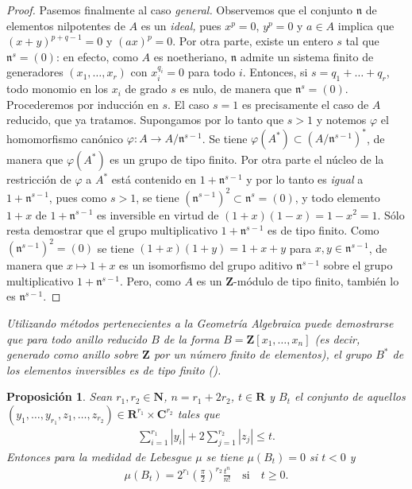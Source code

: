 \documentclass[10pt,oneside,bibtotoc,smallheadings,leqno,a5paper,DIV=12]{scrbook}
\newcommand{\RR}{\mathbf{R}}
\newcommand{\ZZ}{\mathbf{Z}}
\newcommand{\NN}{\mathbf{N}}
\newcommand{\CC}{\mathbf{C}}
\newcommand{\idl}[1]{\mathfrak{#1}}
\newcommand{\QED}{}%
\newcommand{\abs}[1]{\left\lvert#1\right\rvert}
\renewcommand{\to}[1][]{\xrightarrow{#1}}
\numberwithin{equation}{section}
\newenvironment{comm}%
	{\begin{trivlist}\item\small\itshape}
	{\end{trivlist}}
\theoremstyle{defi}
\theoremstyle{enonce}
\newtheorem*{proposition*}{Proposici\'on}
\theoremstyle{rem}
\numberwithin{theorem}{section}
\numberwithin{proposition}{section}
\numberwithin{definition}{section}
\numberwithin{lemma}{section}
\numberwithin{corollary}{section}
\numberwithin{example}{section}
\numberwithin{footnote}{section}%
\begin{document}
\begin{proof}
Pasemos finalmente al caso {\em general.} Observemos que el conjunto $\idl{n}$ de elementos nilpotentes de $A$
es un {\em ideal,} pues $x^{p}=0$, $y^{p}=0$ y $a\in A$ implica que $(x+y)^{p+q-1}=0$ y $(ax)^{p}=0$. Por otra parte,
existe un entero $s$ tal que $\idl{n}^{s}=(0)$: en efecto, como $A$ es noetheriano, $\idl{n}$ admite un sistema
finito de generadores $(x_{1},\dots,x_{r})$ con $x_{i}^{q_{i}}=0$ para todo $i$. Entonces, si $s = q_{1}+\dots+q_{r}$,
todo monomio en los $x_{i}$ de grado $s$ es nulo, de manera que $\idl{n}^{s}=(0)$. Procederemos por inducci\'on
en $s$. El caso $s=1$ es precisamente el caso de $A$ reducido, que ya tratamos. Supongamos por lo tanto que
$s>1$ y notemos $\varphi$ el homomorfismo can\'onico $\varphi:A\to A/\idl{n}^{s-1}$. Se tiene
$\varphi(A^{*})\subset(A/\idl{n}^{s-1})^{*}$, de manera que $\varphi(A^{*})$ es un grupo de tipo finito. Por
otra parte el n\'ucleo de la restricci\'on de $\varphi$ a $A^{*}$ est\'a contenido en $1+\idl{n}^{s-1}$ y
por lo tanto es {\em igual} a $1+\idl{n}^{s-1}$, pues como $s>1$, se tiene $(\idl{n}^{s-1})^{2}\subset\idl{n}^{s}=(0)$,
y todo elemento $1+x$ de $1+\idl{n}^{s-1}$ es inversible en virtud de
$(1+x)(1-x) = 1-x^{2}=1$. S\'olo resta demostrar que el grupo multiplicativo $1+\idl{n}^{s-1}$ es de tipo finito.
Como $(\idl{n}^{s-1})^{2}=(0)$ se tiene $(1+x)(1+y) = 1+x+y$ para $x,y\in\idl{n}^{s-1}$, de manera que
$x\mapsto 1+x$ es un isomorfismo del grupo aditivo $\idl{n}^{s-1}$ sobre el grupo multiplicativo $1+\idl{n}^{s-1}$.
Pero, como $A$ es un $\ZZ$-m\'odulo de tipo finito, tambi\'en lo es $\idl{n}^{s-1}$. \QED
\end{proof}

\begin{comm}
Utilizando m\'etodos pertenecientes a la Geometr\'ia Algebraica puede demostrarse que para todo anillo
{\em reducido} $B$ de la forma $B = \ZZ[x_{1},\dots,x_{n}]$ (es decir, generado como anillo sobre $\ZZ$ por un
n\'umero finito de elementos), el grupo $B^{*}$ de los elementos inversibles es de tipo finito (\cite{Samuel1}).
\end{comm}


\begin{proposition*}
Sean $r_{1},r_{2}\in\NN$, $n=r_{1}+2r_{2}$, $t\in\RR$ y $B_{t}$ el conjunto de aquellos
$(y_{1},\dots,y_{r_{1}},z_{1},\dots,z_{r_{2}})\in\RR^{r_{1}}\times\CC^{r_{2}}$ tales que
\begin{gather}
\sum_{i=1}^{r_{1}}\abs{y_{i}}+2\sum_{j=1}^{r_{2}}\abs{z_{j}}\leq t.
\end{gather}
Entonces para la medidad de Lebesgue $\mu$ se tiene $\mu(B_{t})=0$ si $t < 0$ y
\begin{gather}\label{eq-4-ap-2}
\mu(B_{t}) = 2^{r_{1}}\left(\frac{\pi}{2}\right)^{r_{2}}\frac{t^{n}}{n!}\quad\text{si}\quad t\geq 0.
\end{gather}
\end{proposition*}
\end{document}
